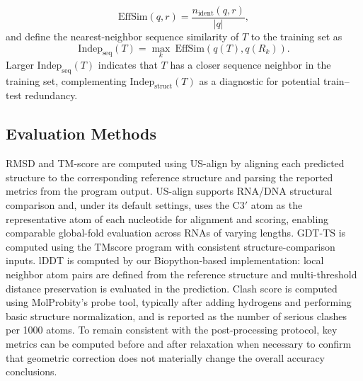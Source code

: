 $$  
\mathrm{EffSim}(q,r)=\frac{n_{\mathrm{ident}}(q,r)}{|q|},  
$$
and define the nearest-neighbor sequence similarity of $T$ to the training set as  
$$
\mathrm{Indep}_{\mathrm{seq}}(T)=\max_k\ \mathrm{EffSim}\left(q(T),q(R_k)\right).  
$$
Larger $\mathrm{Indep}_{\mathrm{seq}}(T)$ indicates that $T$ has a closer sequence neighbor in the training set, complementing $\mathrm{Indep}_{\mathrm{struct}}(T)$ as a diagnostic for potential train–test redundancy.

\subsection{Evaluation Methods}

RMSD and TM-score are computed using US-align by aligning each predicted structure to the corresponding reference structure and parsing the reported metrics from the program output. US-align supports RNA/DNA structural comparison and, under its default settings, uses the C3$'$ atom as the representative atom of each nucleotide for alignment and scoring, enabling comparable global-fold evaluation across RNAs of varying lengths. GDT-TS is computed using the TMscore program with consistent structure-comparison inputs. lDDT is computed by our Biopython-based implementation: local neighbor atom pairs are defined from the reference structure and multi-threshold distance preservation is evaluated in the prediction. Clash score is computed using MolProbity’s probe tool, typically after adding hydrogens and performing basic structure normalization, and is reported as the number of serious clashes per 1000 atoms. To remain consistent with the post-processing protocol, key metrics can be computed before and after relaxation when necessary to confirm that geometric correction does not materially change the overall accuracy conclusions.